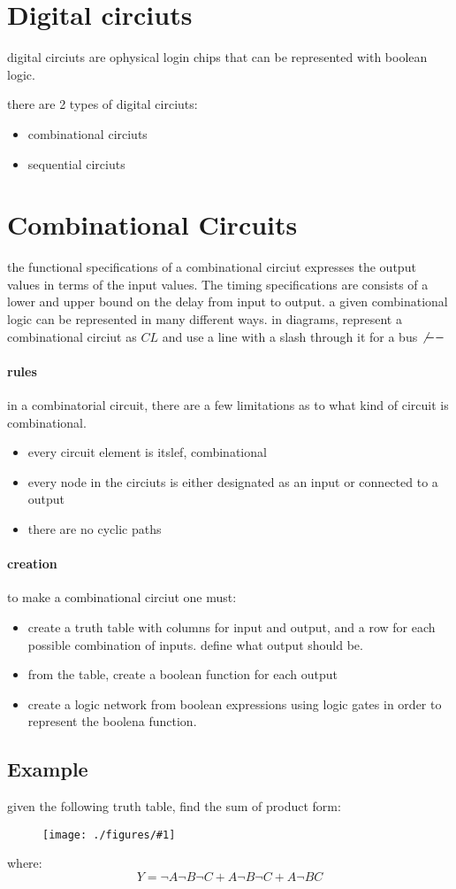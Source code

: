 \documentclass[12pt]{book}
\title{\coursetitle\linebreak\lecturename}
\author{\\Cain Susko\\ 
           \\ \\ \\
      Queen's University 
    \\School of Computing\\}
\newcommand{\incimg}[2]{%
       \begin{figure}[h]
               \centering
               \texttt{[image: ./figures/\#1]}
       \end{figure}
}
\begin{document}
\begin{titlepage}
        \maketitle
\end{titlepage}


\section*{Digital circiuts}
digital circiuts are ophysical login chips that can be represented with boolean logic.

there are 2 types of digital circiuts:
\begin{itemize}
        \item combinational circiuts
        \item sequential circiuts
\end{itemize}

\section*{Combinational Circuits}
the functional specifications of a combinational circiut expresses the output values in terms of the input values.
The timing specifications are consists of a lower and upper bound on the delay from input to output.
a given combinational logic can be represented in many different ways.
in diagrams, represent a combinational circiut as $CL$ and use a line with a slash through it for a bus $\not --$

\paragraph{rules}
in a combinatorial circuit, there are a few limitations as to what kind of circuit is combinational.
\begin{itemize}
        \item every circuit element is itslef, combinational
        \item every node in the circiuts is either designated as an input or connected to a output
        \item there are no cyclic paths
\end{itemize}

\paragraph{creation}
to make a combinational circiut one must:
\begin{itemize}
        \item create a truth table with columns for input and output, and a row for each possible combination of inputs. define what output should be.
        \item from the table, create a boolean function for each output
        \item create a logic network from boolean expressions using logic gates in order to represent the boolena function.
\end{itemize}

\subsection*{Example}
given the following truth table, find the sum of product form:
\incimg{truthtable}{0.5}
where:
\[Y = \neg A \neg B \neg C + A \neg B \neg C + A \neg B C\]
\end{document}
